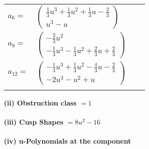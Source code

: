 \documentclass[1p]{elsarticle_modified}
\theoremstyle{definition}
\begin{document}
\begin{tabular}{m{7pt} m{180pt} m{7pt} m{180pt} }
\flushright $a_{6}=$&$\begin{pmatrix}\frac{1}{3} u^3+\frac{1}{3} u^2+\frac{1}{3} u-\frac{2}{3}\\u^3- u\end{pmatrix}$ \\
\flushright $a_{8}=$&$\begin{pmatrix}-\frac{2}{3} u^2\\-\frac{1}{3} u^3-\frac{1}{3} u^2+\frac{2}{3} u+\frac{2}{3}\end{pmatrix}$ \\
\flushright $a_{12}=$&$\begin{pmatrix}-\frac{1}{3} u^3+\frac{1}{3} u^2-\frac{4}{3} u-\frac{2}{3}\\-2 u^3- u^2+u\end{pmatrix}$\\&\end{tabular}
\flushleft \textbf{(ii) Obstruction class $= 1$}\\~\\
\flushleft \textbf{(iii) Cusp Shapes $= 8 u^2-16$}\\~\\
\newpage\renewcommand{\arraystretch}{1}
\flushleft \textbf{(iv) u-Polynomials at the component}\newline \\
\end{document}
